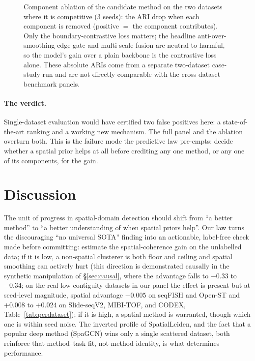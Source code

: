 \documentclass[journal]{IEEEtran}
\begin{document}
\begin{figure}[!t]\centering
\resizebox{\linewidth}{!}{}
\caption{Component ablation of the candidate method on the two datasets where it is competitive (3 seeds):
the ARI drop when each component is removed (positive $=$ the component contributes). Only the
boundary-contrastive loss matters; the headline anti-over-smoothing edge gate and multi-scale
fusion are neutral-to-harmful, so the model's gain over a plain backbone is the contrastive loss alone.
These absolute ARIs come from a separate two-dataset case-study run and are not directly comparable with
the cross-dataset benchmark panels.}
\label{fig:ablation}
\end{figure}

\paragraph{The verdict.} Single-dataset evaluation would have certified two false positives here: a
state-of-the-art ranking and a working new mechanism. The full panel and the ablation overturn both. This
is the failure mode the predictive law pre-empts: decide whether a spatial prior helps at all before
crediting any one method, or any one of its components, for the gain.

\section{Discussion}
The unit of progress in spatial-domain detection should shift from ``a better method'' to ``a better
understanding of when spatial priors help''. Our law turns the discouraging ``no universal SOTA'' finding
into an actionable, label-free check made before committing: estimate the spatial-coherence gain on the
unlabelled data; if it is low, a non-spatial clusterer is both floor and ceiling and spatial smoothing can
actively hurt (this direction is demonstrated causally in the synthetic manipulation of \S\ref{sec:causal},
where the advantage falls to $-0.33$ to $-0.34$; on the real low-contiguity datasets in our panel the effect
is present but at seed-level magnitude, spatial advantage $-0.005$ on seqFISH and Open-ST and $+0.008$ to
$+0.024$ on Slide-seqV2, MIBI-TOF, and CODEX, Table~\ref{tab:perdataset}); if it is
high, a spatial method is warranted, though which one is within seed noise. The inverted
profile of SpatialLeiden, and the fact that a popular deep method (SpaGCN) wins only a single scattered
dataset, both reinforce that method--task fit, not method identity, is what determines performance.
\end{document}
